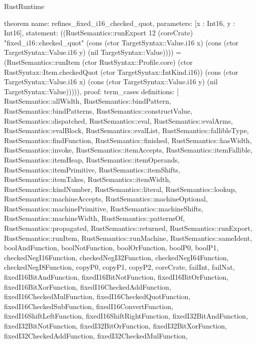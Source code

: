 \begin{lexlean}{RustRuntime}
\begin{semanticmodule}
theorem{
  name: refines_fixed_i16_checked_quot,
  parameters: [x : Int16, y : Int16],
  statement: ((RustSemantics::runExport 12 (coreCrate) "fixed_i16::checked_quot" (cons (ctor TargetSyntax::Value.i16 x) (cons (ctor TargetSyntax::Value.i16 y) (nil TargetSyntax::Value)))) = (RustSemantics::runItem (ctor RustSyntax::Profile.core) (ctor RustSyntax::Item.checkedQuot (ctor TargetSyntax::IntKind.i16)) (cons (ctor TargetSyntax::Value.i16 x) (cons (ctor TargetSyntax::Value.i16 y) (nil TargetSyntax::Value))))),
  proof: term_cases{
    definitions: [
      RustSemantics::allWidth,
      RustSemantics::bindPattern,
      RustSemantics::bindPatterns,
      RustSemantics::constructValue,
      RustSemantics::dispatched,
      RustSemantics::eval,
      RustSemantics::evalArms,
      RustSemantics::evalBlock,
      RustSemantics::evalList,
      RustSemantics::fallibleType,
      RustSemantics::findFunction,
      RustSemantics::finished,
      RustSemantics::hasWidth,
      RustSemantics::invoke,
      RustSemantics::itemAccepts,
      RustSemantics::itemFallible,
      RustSemantics::itemHeap,
      RustSemantics::itemOperands,
      RustSemantics::itemPrimitive,
      RustSemantics::itemShifts,
      RustSemantics::itemTakes,
      RustSemantics::itemWidth,
      RustSemantics::kindNumber,
      RustSemantics::literal,
      RustSemantics::lookup,
      RustSemantics::machineAccepts,
      RustSemantics::machineOptional,
      RustSemantics::machinePrimitive,
      RustSemantics::machineShifts,
      RustSemantics::machineWidth,
      RustSemantics::patternsOf,
      RustSemantics::propagated,
      RustSemantics::returned,
      RustSemantics::runExport,
      RustSemantics::runItem,
      RustSemantics::runMachine,
      RustSemantics::sameIdent,
      boolAndFunction,
      boolNotFunction,
      boolOrFunction,
      boolP0,
      boolP1,
      checkedNegI16Function,
      checkedNegI32Function,
      checkedNegI64Function,
      checkedNegI8Function,
      copyP0,
      copyP1,
      copyP2,
      coreCrate,
      failInt,
      failNat,
      fixedI16BitAndFunction,
      fixedI16BitNotFunction,
      fixedI16BitOrFunction,
      fixedI16BitXorFunction,
      fixedI16CheckedAddFunction,
      fixedI16CheckedMulFunction,
      fixedI16CheckedQuotFunction,
      fixedI16CheckedSubFunction,
      fixedI16ConvertFunction,
      fixedI16ShiftLeftFunction,
      fixedI16ShiftRightFunction,
      fixedI32BitAndFunction,
      fixedI32BitNotFunction,
      fixedI32BitOrFunction,
      fixedI32BitXorFunction,
      fixedI32CheckedAddFunction,
      fixedI32CheckedMulFunction,
}}
\end{semanticmodule}
\end{lexlean}
